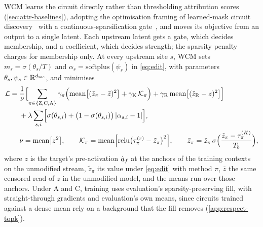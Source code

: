 \documentclass[10pt]{article}
\begin{document}
WCM learns the circuit directly rather than thresholding attribution scores (\cref{sec:attr-baselines}), adopting the optimisation framing of learned-mask circuit discovery~\citep{bhaskar2024finding, caples2025scaling} with a continuous-sparsification gate~\citep{savarese2020winning}, and moves its objective from an output to a single latent.
Each upstream latent gets a gate, which decides membership, and a coefficient, which decides strength; the sparsity penalty charges for membership only.
At every upstream site $s$, WCM sets $m_s = \sigma(\theta_s / T)$ and $\alpha_s = \mathrm{softplus}(\psi_s)$ in \eqref{eq:edit}, with parameters $\theta_s, \psi_s \in \mathbb{R}^{d_{\mathrm{sae}}}$, and minimises
\begin{equation}\label{eq:loss}
\begin{aligned}
    \mathcal{L} = {} & \frac{1}{\nu} \Bigl[ \sum_{\pi \in \{\mathrm{Z}, \mathrm{C}, \mathrm{A}\}} \gamma_{\pi} \Bigl( \operatorname{mean}\bigl[(\bar{z}_{\pi} - \bar{z})^{2}\bigr] + \gamma_{\mathrm{K}}\, \mathcal{K}_{\pi} \Bigr) + \gamma_{\mathrm{R}} \operatorname{mean}\bigl[(\tilde{z}_{\mathrm{R}} - z)^{2}\bigr] \Bigr] \\
    & + \lambda \sum_{s, i} \Bigl[ \sigma(\theta_{s,i}) + \bigl(1 - \sigma(\theta_{s,i})\bigr)\, \lvert \alpha_{s,i} - 1 \rvert \Bigr], \\
    & \nu = \operatorname{mean}\bigl[z^{2}\bigr], \qquad
    \mathcal{K}_{\pi} = \operatorname{mean}\Bigl[\operatorname{relu}\bigl(\tau^{(r)}_{\pi} - \tilde{z}_{\pi}\bigr)^{2}\Bigr], \qquad
    \bar{z}_{\pi} = \tilde{z}_{\pi}\, \sigma\Bigl(\frac{\tilde{z}_{\pi} - \tau^{(K)}_{\pi}}{T_{b}}\Bigr),
\end{aligned}
\end{equation}
where $z$ is the target's pre-activation $\hat{a}_f$ at the anchors of the training contexts on the unmodified stream, $\tilde{z}_{\pi}$ its value under \eqref{eq:edit} with method $\pi$, $\bar{z}$ the same censored read of $z$ in the unmodified model, and the means run over those anchors.
Under A and C, training uses evaluation's sparsity-preserving fill, with straight-through gradients and evaluation's own means, since circuits trained against a dense mean rely on a background that the fill removes (\cref{app:respect-topk}).
\end{document}
